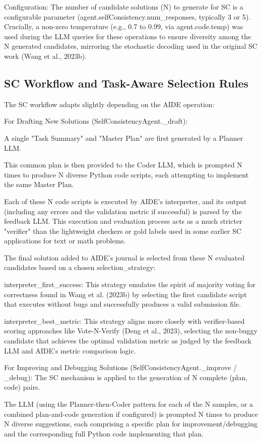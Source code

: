 Configuration: The number of candidate solutions (N) to generate for SC is a configurable parameter (agent.selfConsistency.num\_responses, typically 3 or 5). Crucially, a non-zero temperature (e.g., 0.7 to 0.99, via agent.code.temp) was used during the LLM queries for these operations to ensure diversity among the N generated candidates, mirroring the stochastic decoding used in the original SC work (Wang et al., 2023b).

\subsection{SC Workflow and Task-Aware Selection Rules}
The SC workflow adapts slightly depending on the AIDE operation:

For Drafting New Solutions (SelfConsistencyAgent.\_draft):

A single "Task Summary" and "Master Plan" are first generated by a Planner LLM.

This common plan is then provided to the Coder LLM, which is prompted N times to produce N diverse Python code scripts, each attempting to implement the same Master Plan.

Each of these N code scripts is executed by AIDE's interpreter, and its output (including any errors and the validation metric if successful) is parsed by the feedback LLM. This execution and evaluation process acts as a much stricter "verifier" than the lightweight checkers or gold labels used in some earlier SC applications for text or math problems.

The final solution added to AIDE's journal is selected from these N evaluated candidates based on a chosen selection_strategy:

interpreter_first_success: This strategy emulates the spirit of majority voting for correctness found in Wang et al. (2023b) by selecting the first candidate script that executes without bugs and successfully produces a valid submission file.

interpreter_best_metric: This strategy aligns more closely with verifier-based scoring approaches like Vote-N-Verify (Deng et al., 2023), selecting the non-buggy candidate that achieves the optimal validation metric as judged by the feedback LLM and AIDE's metric comparison logic.

For Improving and Debugging Solutions (SelfConsistencyAgent._improve / _debug):
The SC mechanism is applied to the generation of N complete (plan, code) pairs.

The LLM (using the Planner-then-Coder pattern for each of the N samples, or a combined plan-and-code generation if configured) is prompted N times to produce N diverse suggestions, each comprising a specific plan for improvement/debugging and the corresponding full Python code implementing that plan.

